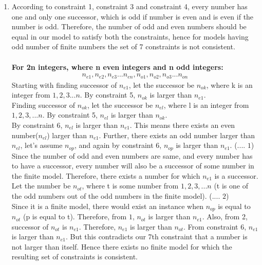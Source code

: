 \documentclass[12pt]{article}
\begin{document}
\begin{enumerate}[label=(\alph*)]
  \addtocounter{enumi}{1}
  \item According to constraint 1, constraint 3 and constraint 4, every number has one and only one successor, which is odd if number is even and is even if the number is odd. Therefore, the number of odd and even numbers should be equal in our model to satisfy both the constraints, hence for models having odd number of finite numbers the set of 7 constraints is not consistent. \\ \\
  \textbf{For 2n integers, where n even integers and n odd integers:} \\
  \begin{align*}
  n_{e1}, n_{e2}, n_{e3} ... n_{en}, n_{o1}, n_{o2}, n_{o3} ... n_{on}
  \end{align*}
  Starting with finding successor of $n_{e1}$, let the successor be $n_{ok}$, where k is an integer from $1, 2, 3 ... n$. By constraint 5, $n_{ok}$ is larger than $n_{e1}$. \\
  
  Finding successor of $n_{ok}$, let the successor be $n_{el}$, where l is an integer from $1, 2, 3, ... n$. By constraint 5, $n_{el}$ is larger than $n_{ok}$. \\
  
  By constraint 6, $n_{el}$ is larger than $n_{e1}$. This means there exists an even number($n_{el}$) larger than $n_{e1}$. Further, there exists an odd number larger than $n_{el}$, let's assume $n_{op}$, and again by constraint 6, $n_{op}$ is larger than $n_{e1}$. (.... $1$) \\
  
  Since the number of odd and even numbers are same, and every number has to have a successor, every number will also be a successor of some number in the finite model. Therefore, there exists a number for which $n_{e1}$ is a successor. Let the number be $n_{ot}$, where t is some number from $1, 2, 3, ... n$ (t is one of the odd numbers out of the odd numbers in the finite model). (.... $2$) \\
  
  Since it is a finite model, there would exist an instance when $n_{op}$ is equal to $n_{ot}$ (p is equal to t). Therefore, from $1$, $n_{ot}$ is larger than $n_{e1}$. Also, from 2, successor of $n_{ot}$ is $n_{e1}$. Therefore, $n_{e1}$ is larger than $n_{ot}$. From constraint 6, $n_{e1}$ is larger than $n_{e1}$. But this contradicts our 7th constraint that a number is not larger than itself. Hence there exists no finite model for which the resulting set of constraints is consistent.
\end{enumerate}
\end{document}
